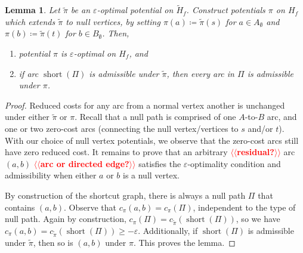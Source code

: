 \documentclass[11pt]{article}
\makeatletter
\def\eps{\varepsilon}
\def\short{\operatorname{short}}
\theoremstyle{plain}
\newtheorem{lemma}{Lemma}[section]
\numberwithin{figure}{section}
\def\EMPH#1{\textbf{\boldmath #1}}
\def\n@te#1{\textsf{\boldmath \textbf{$\langle\!\langle$#1$\rangle\!\rangle$}}\leavevmode}
\def\note#1{\textcolor{red}{\n@te{#1}}}
\makeatother
\begin{document}
\begin{lemma}
\label{lemma:empty_correct}
Let \EMPH{$\tilde{\pi}$} be an $\eps$-optimal potential on $\tilde{H}_f$.
Construct potentials $\pi$ on $H_f$ which extends $\tilde{\pi}$ to null vertices, by
setting $\pi(a) \coloneqq \tilde{\pi}(s)$ for $a \in A_\emptyset$ and
$\pi(b) \coloneqq \tilde{\pi}(t)$ for $b \in B_\emptyset$.
Then,
\begin{enumerate}
\item potential $\pi$ is $\eps$-optimal on  $H_f$, and
\item if arc $\short(\Pi)$ is admissible under $\tilde{\pi}$, then every arc in $\Pi$ is admissible under $\pi$.
\end{enumerate}
\end{lemma}

\begin{proof}
Reduced costs for any arc from a normal vertex another is unchanged under either
$\tilde{\pi}$ or $\pi$.
Recall that a null path is comprised of one $A$-to-$B$ arc, and one or two
zero-cost arcs (connecting the null vertex/vertices to $s$ and/or $t$).
With our choice of null vertex potentials, we observe that the zero-cost arcs
still have zero reduced cost.
It remains to prove that an arbitrary \note{residual?} arc $(a, b)$ \note{arc or directed edge?} satisfies the $\eps$-optimality condition and admissibility when either $a$ or $b$ is a null vertex.

By construction of the shortcut graph,
there is always a null path $\Pi$ that contains $(a, b)$.
Observe that $c_\pi(a, b) = c_\pi(\Pi)$, independent to the type of null path.
Again by construction, $c_\pi(\Pi) = c_{\tilde{\pi}}(\short(\Pi))$, so we have
$c_\pi(a, b) = c_{\tilde{\pi}}(\short(\Pi)) \geq -\eps$.
Additionally, if $\short(\Pi)$ is admissible under $\tilde{\pi}$, then so is
$(a, b)$ under $\pi$.
%
This proves the lemma.
\end{proof}
\end{document}

